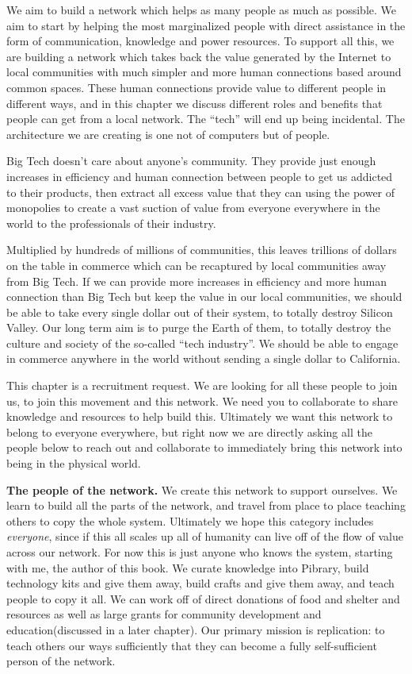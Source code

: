 

We aim to build a network which helps as many people as much as
possible. We aim to start by helping the most marginalized people with
direct assistance in the form of communication, knowledge and power
resources. To support all this, we are building a network which takes
back the value generated by the Internet to local communities with much
simpler and more human connections based around common spaces. These
human connections provide value to different people in different ways,
and in this chapter we discuss different roles and benefits that people
can get from a local network. The ``tech'' will end up being incidental.
The architecture we are creating is one not of computers but of people.

Big Tech doesn't care about anyone's community. They provide just enough
increases in efficiency and human connection between people to get us
addicted to their products, then extract all excess value that they can
using the power of monopolies to create a vast suction of value from
everyone everywhere in the world to the professionals of their industry.

Multiplied by hundreds of millions of communities, this leaves trillions
of dollars on the table in commerce which can be recaptured by local
communities away from Big Tech. If we can provide more increases in
efficiency and more human connection than Big Tech but keep the value in
our local communities, we should be able to take every single dollar out
of their system, to totally destroy Silicon Valley. Our long term aim is
to purge the Earth of them, to totally destroy the culture and society
of the so-called ``tech industry''. We should be able to engage in
commerce anywhere in the world without sending a single dollar to
California.

This chapter is a recruitment request. We are looking for all these
people to join us, to join this movement and this network. We need you
to collaborate to share knowledge and resources to help build this.
Ultimately we want this network to belong to everyone everywhere, but
right now we are directly asking all the people below to reach out and
collaborate to immediately bring this network into being in the physical
world.

\textbf{The people of the network.} We create this network to support
ourselves. We learn to build all the parts of the network, and travel
from place to place teaching others to copy the whole system. Ultimately
we hope this category includes \emph{everyone}, since if this all scales
up all of humanity can live off of the flow of value across our network.
For now this is just anyone who knows the system, starting with me, the
author of this book. We curate knowledge into Pibrary, build technology
kits and give them away, build crafts and give them away, and teach
people to copy it all. We can work off of direct donations of food and
shelter and resources as well as large grants for community development
and education(discussed in a later chapter). Our primary mission is
replication: to teach others our ways sufficiently that they can become
a fully self-sufficient person of the network.

